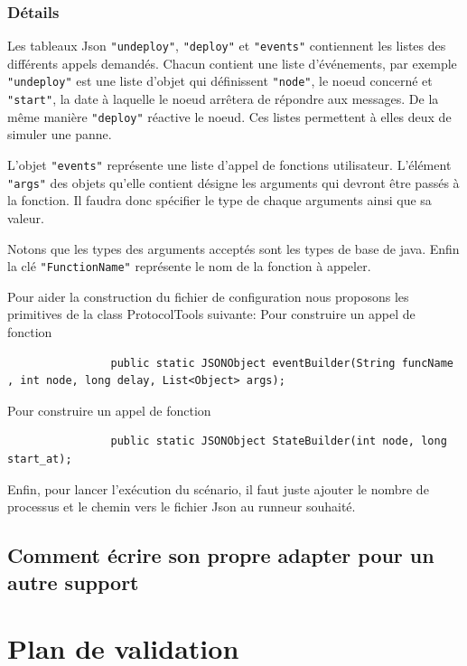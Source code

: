\documentclass{article}
\begin{document}
			\subsubsection{Détails}
			Les tableaux Json \lstinline{"undeploy"}, \lstinline{"deploy"} et \lstinline{"events"} contiennent
			les listes des différents appels demandés.
			Chacun contient une liste d'événements, par exemple \lstinline{"undeploy"} est une liste
			d'objet qui définissent \lstinline{"node"}, le noeud concerné et \lstinline{"start"}, la
			date à laquelle le noeud arrêtera de répondre aux messages.
			De la même manière \lstinline{"deploy"} réactive le noeud. Ces listes permettent à elles
			deux de simuler une panne.
			\bigskip

			L'objet \lstinline{"events"} représente une liste d'appel de fonctions utilisateur.
			L'élément \lstinline{"args"} des objets qu'elle contient désigne les arguments qui
			devront être passés à la fonction. Il faudra donc spécifier le type de chaque arguments
			ainsi que sa valeur.

			Notons que les types des arguments acceptés sont les types de base de java.
			Enfin la clé \lstinline{"FunctionName"} représente le nom de la fonction à appeler.
			\bigskip

			Pour aider la construction du fichier de configuration nous proposons les primitives de la class ProtocolTools suivante:
			\newline
			Pour construire un appel de fonction
			\begin{lstlisting}
				public static JSONObject eventBuilder(String funcName , int node, long delay, List<Object> args);
			\end{lstlisting}
			Pour construire un appel de fonction
			\begin{lstlisting}
				public static JSONObject StateBuilder(int node, long start_at);
			\end{lstlisting}

			Enfin, pour lancer l'exécution du scénario, il faut juste ajouter le nombre de processus et le chemin vers le fichier Json au runneur souhaité.
		\newpage		
		\subsection{Comment écrire son propre adapter pour un autre support}

		
		\section{Plan de validation}
\end{document}
